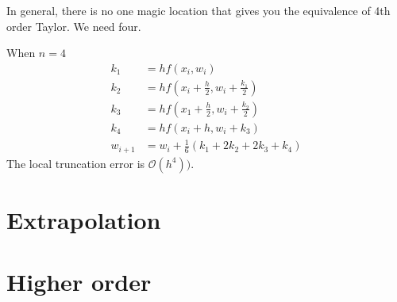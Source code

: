\documentclass[class=article, crop=false]{standalone}
\theoremstyle{plain}
\theoremstyle{remark}
\begin{document}
In general, there is no one magic location that gives you the equivalence of 4th order Taylor. We need four.

When $n=4$
\begin{equation*}
\begin{split}
	k_1 &= h f(x_i,w_i)\\ 
	k_2 & = h f(x_i+\frac{h}{2},w_i + \frac{k_1}{2}) \\
	k_3 & = h f(x_1 + \frac{h}{2},w_i + \frac{k_2}{2}) \\
	k_4 & = h f(x_i + h, w_i+k_3)\\
	w_{i+1} &= w_i + \frac{1}{6}(k_1+2k_2+2k_3+k_4) 
\end{split}
\end{equation*}
The local truncation error is $\mathcal{O}(h^4) ) $.

\section{Extrapolation}
\section{Higher order}
\end{document}
